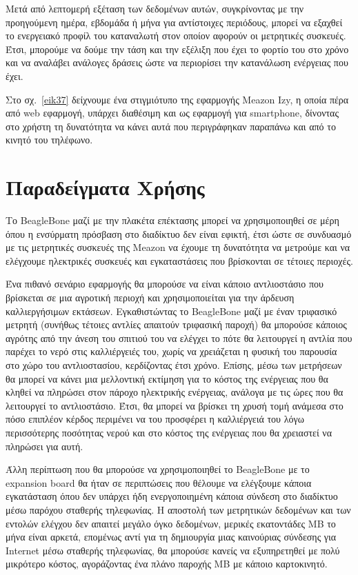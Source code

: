 \documentclass[12pt, a4paper, oneside]{report}
\begin{document}
Μετά από λεπτομερή εξέταση των δεδομένων αυτών, συγκρίνοντας με την προηγούμενη ημέρα, εβδομάδα ή μήνα για αντίστοιχες περιόδους, μπορεί να εξαχθεί το ενεργειακό προφίλ του καταναλωτή στον οποίον αφορούν οι μετρητικές συσκευές. Έτσι, μπορούμε να δούμε την τάση και την εξέλιξη που έχει το φορτίο του στο χρόνο και να αναλάβει ανάλογες δράσεις ώστε να περιορίσει την κατανάλωση ενέργειας που έχει.

Στο σχ.~\ref{eik37} δείχνουμε ένα στιγμιότυπο της εφαρμογής Meazon Izy, η οποία πέρα από web εφαρμογή, υπάρχει διαθέσιμη και ως εφαρμογή για smartphone, δίνοντας στο χρήστη τη δυνατότητα να κάνει αυτά που περιγράφηκαν παραπάνω και από το κινητό του τηλέφωνο.

\section{Παραδείγματα Χρήσης}

Το BeagleBone μαζί με την πλακέτα επέκτασης μπορεί να χρησιμοποιηθεί σε μέρη όπου η ενσύρματη πρόσβαση στο διαδίκτυο δεν είναι εφικτή, έτσι ώστε σε συνδυασμό με τις μετρητικές συσκευές της Meazon να έχουμε τη δυνατότητα να μετρούμε και να ελέγχουμε ηλεκτρικές συσκευές και εγκαταστάσεις που βρίσκονται σε τέτοιες περιοχές.

Ένα πιθανό σενάριο εφαρμογής θα μπορούσε να είναι κάποιο αντλιοστάσιο που βρίσκεται σε μια αγροτική περιοχή και χρησιμοποιείται για την άρδευση καλλιεργήσιμων εκτάσεων. Εγκαθιστώντας το BeagleBone μαζί με έναν τριφασικό μετρητή (συνήθως τέτοιες αντλίες απαιτούν τριφασική παροχή) θα μπορούσε κάποιος αγρότης από την άνεση του σπιτιού του να ελέγχει το πότε θα λειτουργεί η αντλία που παρέχει το νερό στις καλλιέργειές του, χωρίς να χρειάζεται η φυσική του παρουσία στο χώρο του αντλιοστασίου, κερδίζοντας έτσι χρόνο. Επίσης, μέσω των μετρήσεων θα μπορεί να κάνει μια μελλοντική εκτίμηση για το κόστος της ενέργειας που θα κληθεί να πληρώσει στον πάροχο ηλεκτρικής ενέργειας, ανάλογα με τις ώρες που θα λειτουργεί το αντλιοστάσιο. Έτσι, θα μπορεί να βρίσκει τη χρυσή τομή ανάμεσα στο πόσο επιπλέον κέρδος περιμένει να του προσφέρει η καλλιέργειά του λόγω περισσότερης ποσότητας νερού και στο κόστος της ενέργειας που θα χρειαστεί να πληρώσει για αυτή.

Άλλη περίπτωση που θα μπορούσε να χρησιμοποιηθεί το BeagleBone με το expansion board θα ήταν σε περιπτώσεις που θέλουμε να ελέγξουμε κάποια εγκατάσταση όπου δεν υπάρχει ήδη ενεργοποιημένη κάποια σύνδεση στο διαδίκτυο μέσω παρόχου σταθερής τηλεφωνίας. Η αποστολή των μετρητικών δεδομένων και των εντολών ελέγχου δεν απαιτεί μεγάλο όγκο δεδομένων, μερικές εκατοντάδες MB το μήνα είναι αρκετά, επομένως αντί για τη δημιουργία μιας καινούριας σύνδεσης για Internet μέσω σταθερής τηλεφωνίας, θα μπορούσε κανείς να εξυπηρετηθεί με πολύ μικρότερο κόστος, αγοράζοντας ένα πλάνο παροχής MB με κάποιο καρτοκινητό.
\end{document}

